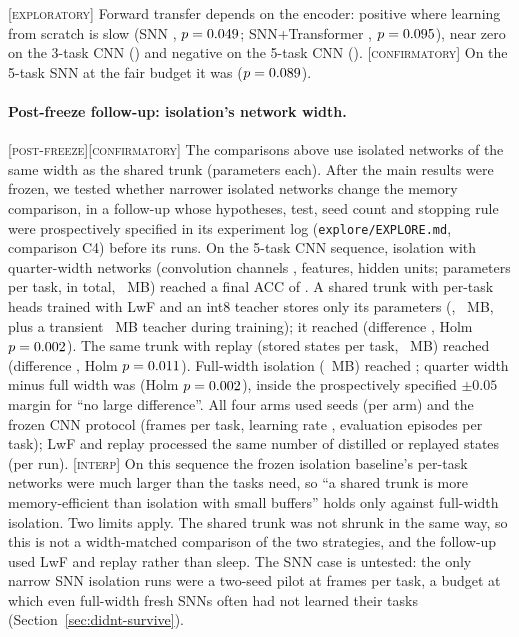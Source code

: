 \documentclass[10pt]{article}
\newcommand{\interp}{\textsc{[interp]}\xspace}
\newcommand{\conf}{\textsc{[confirmatory]}\xspace}
\newcommand{\expl}{\textsc{[exploratory]}\xspace}
\newcommand{\postfz}{\textsc{[post-freeze]}\xspace}
\begin{document}
\expl Forward transfer depends on the encoder: positive where learning from scratch is slow (SNN \fwtSnn,
$p=0.049$; SNN+Transformer \fwtHyb, $p=0.095$), near zero on the 3-task CNN (\fwtCnn) and negative on the 5-task
CNN (\fwtCnnFive). \conf On the 5-task SNN at the fair budget it was \fiveSnnFairFwt ($p=0.089$).

\paragraph{Post-freeze follow-up: isolation's network width.} \postfz\conf The comparisons above use isolated
networks of the same width as the shared trunk (\paramsCnnPerTask parameters each). After the main results were
frozen, we tested whether narrower isolated networks change the memory comparison, in a follow-up whose hypotheses,
test, seed count and stopping rule were prospectively specified in its experiment log (\texttt{explore/EXPLORE.md},
comparison C4) before its runs. On the 5-task CNN sequence, isolation with quarter-width networks (convolution channels
\postNarrowChannels, \postNarrowFeat features, \postNarrowHidden hidden units; \postNarrowPerTask parameters per task,
\postNarrowParams in total, \postNarrowMb~MB) reached a final ACC of \postNarrowAcc. A shared trunk with per-task heads
trained with LwF and an int8 teacher stores only its parameters (\postLwfParams, \postLwfMb~MB, plus a transient
\postSnapshotMb~MB teacher during training); it reached \postLwfAcc (difference \postHEightCi, Holm
$p=0.002$). The same trunk with replay (\postReplayBuf stored states per task, \postReplayMb~MB) reached
\postReplayAcc (difference \postHNineCi, Holm $p=0.011$). Full-width isolation (\postIsoMb~MB) reached
\postIsoAcc; quarter width minus full width was \postHTenCi (Holm $p=0.002$), inside the prospectively specified
$\pm0.05$ margin for ``no large difference''. All four arms used seeds \postSeeds (\postN per arm) and the frozen CNN
protocol (\framesPerTaskFlat frames per task, learning rate \lrFlat, \evalEpisodesCl evaluation episodes per task); LwF
and replay processed the same number of distilled or replayed states (\postSamples per run).
\interp On this sequence the frozen isolation baseline's per-task networks were much larger than the tasks need, so
``a shared trunk is more memory-efficient than isolation with small buffers'' holds only against full-width
isolation. Two limits apply. The shared trunk was not shrunk in the same way, so this is not a width-matched
comparison of the two strategies, and the follow-up used LwF and replay rather than sleep. The SNN case is untested: the
only narrow SNN isolation runs were a two-seed pilot at \framesPerTaskFlat frames per task, a budget at which even
full-width fresh SNNs often had not learned their tasks (Section~\ref{sec:didnt-survive}).
\end{document}
